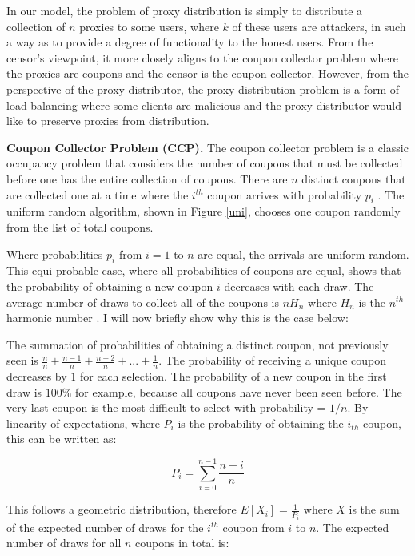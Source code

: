 In our model, the problem of proxy distribution is simply to distribute a collection of $n$ proxies to some users, where $k$ of these users are attackers, in such a way as to provide a degree of functionality to the honest users. From the censor's viewpoint, it more closely aligns to the coupon collector problem where the proxies are coupons and the censor is the coupon collector. However, from the perspective of the proxy distributor, the proxy distribution problem is a form of load balancing where some clients are malicious and the proxy distributor would like to preserve proxies from distribution.

\textbf{Coupon Collector Problem (CCP).} The coupon collector problem is a classic occupancy problem that considers the number of coupons that must be collected before one has the entire collection of coupons. There are $n$ distinct coupons that are collected one at a time where the $i^{th}$ coupon arrives with probability $p_i$ \cite{motwani1995randomized}. The uniform random algorithm, shown in Figure \ref{uni}, chooses one coupon randomly from the list of total coupons.

Where probabilities $p_i$ from $i=1$ to $n$ are equal, the arrivals are uniform random. This equi-probable case, where all probabilities of coupons are equal, shows that the probability of obtaining a new coupon $i$ decreases with each draw. The average number of draws to collect all of the coupons is $nH_n$ where $H_n$ is the $n^{th}$ harmonic number \cite{flajolet1992birthday}. I will now briefly show why this is the case below: 

The summation of probabilities of obtaining a distinct coupon, not previously seen is $\frac{n}{n} + \frac{n-1}{n} + \frac{n-2}{n} + ... + \frac{1}{n}$. The probability of receiving a unique coupon decreases by $1$ for each selection. The probability of a new coupon in the first draw is $100\%$ for example, because all coupons have never been seen before. The very last coupon is the most difficult to select with probability = $1/n$.
By linearity of expectations, where $P_i$ is the probability of obtaining the $i_{th}$ coupon, this can be written as:

$$P_i = \sum_{i=0}^{n-1}\frac{n-i}{n}$$

This follows a geometric distribution, therefore $E[X_i]=\frac{1}{P_i}$ where $X$ is the sum of the expected number of draws for the $i^{th}$ coupon from $i$ to $n$.
The expected number of draws for all $n$ coupons in total is:

